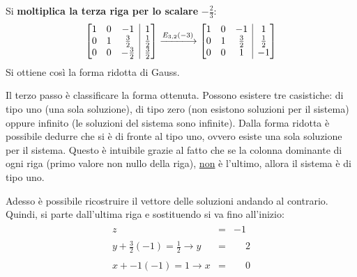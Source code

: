 \documentclass[a4paper]{article}
\makeatletter
\newenvironment{rowequmatbra}[1]{\left[\array{@{}#1@{}}}{\endarray\right]}
\makeatother
\begin{document}
	Si \textbf{moltiplica la terza riga per lo scalare} $-\frac{2}{3}$:
	\begin{equation*}
		\begin{rowequmatbra}{ccc|c}
			1  & 0 & -1 & 1 \\
			0  & 1 &  \frac{3}{2} & \frac{1}{2} \\
			0  & 0 &  -\frac{3}{2} & \frac{3}{2}
		\end{rowequmatbra} \xlongrightarrow{E_{3,2}\left(-3\right)}
		\begin{rowequmatbra}{ccc|c}
			1  & 0 & -1 & 1 \\
			0  & 1 &  \frac{3}{2} & \frac{1}{2} \\
			0  & 0 &  1 & -1
		\end{rowequmatbra}
	\end{equation*}
	Si ottiene così la forma ridotta di Gauss.\newline
	
	\noindent
	Il \textcolor{Red3}{terzo passo} è classificare la forma ottenuta. Possono esistere tre casistiche: di tipo uno (una sola soluzione), di tipo zero (non esistono soluzioni per il sistema) oppure infinito (le soluzioni del sistema sono infinite). Dalla forma ridotta è possibile dedurre che si è di fronte al tipo uno, ovvero esiste una sola soluzione per il sistema. Questo è intuibile grazie al fatto che se la colonna dominante di ogni riga (primo valore non nullo della riga), \underline{non} è l'ultimo, allora il sistema è di tipo uno.
	
	Adesso è possibile ricostruire il vettore delle soluzioni andando al contrario. Quindi, si parte dall'ultima riga e sostituendo si va fino all'inizio:
	\begin{gather*}
		\begin{array}{rll}
			z & = & -1 \\
			\\
			y + \frac{3}{2}\left(-1\right) = \frac{1}{2} \rightarrow y & = & \phantom{-}2 \\
			\\
			x + -1\left(-1\right) = 1 \rightarrow x & = & \phantom{-}0
		\end{array}
	\end{gather*}
\end{document}
